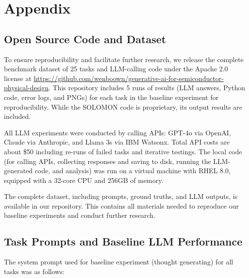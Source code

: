 \documentclass{article}
\begin{document}
\section{Appendix}
\subsection{Open Source Code and Dataset}
\label{appendix:code_and_dataset}

To ensure reproducibility and facilitate further research, we release the complete benchmark dataset of 25 tasks and LLM-calling code under the Apache 2.0 license at \url{https://github.com/wenboown/generative-ai-for-semiconductor-physical-design}. This repository includes 5 runs of results (LLM answers, Python code, error logs, and PNGs) for each task in the baseline experiment for reproducibility. While the SOLOMON code is proprietary, its output results are included.

All LLM experiments were conducted by calling APIs: GPT-4o via OpenAI, Claude via Anthropic, and Llama 3s via IBM Watsonx. Total API costs are about \$50 including re-runs of failed tasks and iterative testings. The local code (for calling APIs, collecting responses and saving to disk, running the LLM-generated code, and analysis) was run on a virtual machine with RHEL 8.0, equipped with a 32-core CPU and 256GB of memory.

The complete dataset, including prompts, ground truths, and LLM outputs, is available in our repository. This contains all materials needed to reproduce our baseline experiments and conduct further research.

\subsection{Task Prompts and Baseline LLM Performance}
\label{appendix:task_prompts_and_performance}

The system prompt used for baseline experiment (thought generating) for all tasks was as follows:
\end{document}
